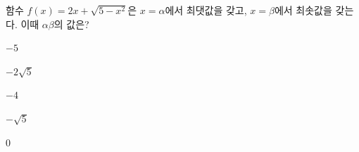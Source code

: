 함수 $f(x)=2x+\sqrt{5-x^2}$은 $x=\alpha$에서 최댓값을 갖고, $x=\beta$에서 최솟값을 갖는다. 이때 $\alpha\beta$의 값은?
\begin{choices32}{\rule[-3ex]{0pt}{8ex}$-5$}{\rule[-3ex]{0pt}{8ex}$-2\sqrt{5}$}{\rule[-3ex]{0pt}{8ex}$-4$}{\rule[-3ex]{0pt}{8ex}$-\sqrt{5}$}{\rule[-3ex]{0pt}{8ex}$0$}\end{choices32}
